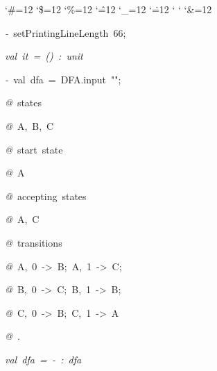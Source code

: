 \begin{list}{}
{\setlength{\leftmargin}{\leftmargini}
\setlength{\rightmargin}{0cm}
\setlength{\itemindent}{0cm}
\setlength{\listparindent}{0cm}
\setlength{\itemsep}{0cm}
\setlength{\parsep}{0cm}
\setlength{\labelsep}{0cm}
\setlength{\labelwidth}{0cm}
\catcode`\#=12
\catcode`\$=12
\catcode`\%=12
\catcode`\^=12
\catcode`\_=12
\catcode`\.=12
\catcode`
\catcode`
\catcode`\&=12
\ttfamily}
\small
\item[]\textsl{-\ }setPrintingLineLength\ 66;
\item[]\textsl{val\ it\ =\ ()\ :\ unit}
\item[]\textsl{-\ }val\ dfa\ =\ DFA.input\ "";
\item[]\textsl{@\ }states
\item[]\textsl{@\ }A,\ B,\ C
\item[]\textsl{@\ }start\ state
\item[]\textsl{@\ }A
\item[]\textsl{@\ }accepting\ states
\item[]\textsl{@\ }A,\ C
\item[]\textsl{@\ }transitions
\item[]\textsl{@\ }A,\ 0\ ->\ B;\ A,\ 1\ ->\ C;
\item[]\textsl{@\ }B,\ 0\ ->\ C;\ B,\ 1\ ->\ B;
\item[]\textsl{@\ }C,\ 0\ ->\ B;\ C,\ 1\ ->\ A
\item[]\textsl{@\ }.
\item[]\textsl{val\ dfa\ =\ -\ :\ dfa}
\end{list}
